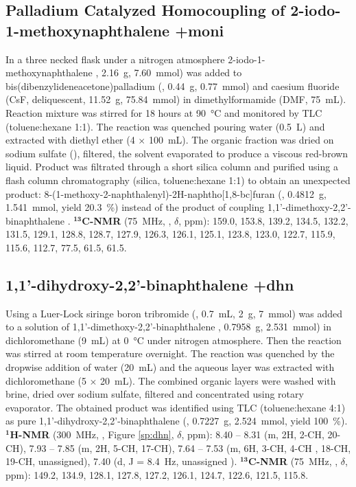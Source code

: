 \subsection{Palladium Catalyzed Homocoupling of 2-iodo-1-methoxy\-naphthalene \cmpd+{moni}}\label{sec:sperimentale-schifo}
In a three necked flask under a nitrogen atmosphere 2-iodo-1-methoxy\-naphthalene , 2.16~g, 7.60~mmol) was added to bis(di\-benzyl\-idene\-acetone)\-palladium (, 0.44~g, 0.77~mmol) and caesium fluoride (CsF, deliquescent, 11.52~g, 75.84~mmol) in dimethylformamide (DMF, 75~mL). Reaction mixture was stirred for 18 hours at \SI{90}{\celsius} and monitored by TLC (toluene\-:hexane 1:1). The reaction was quenched pouring water (0.5~L) and extracted with diethyl ether (4 $\times$ 100~mL). The organic fraction was dried on sodium sulfate (), filtered, 
the solvent evaporated to produce a viscous red-brown liquid. Product was filtrated through a short silica column and purified using a flash column chromatography (silica, toluene\-:hexane 1:1) to obtain an unexpected product: 8-(1-methoxy-2-naphthalenyl)-2H-naphtho[1,8-bc]furan (, 0.4812~g, 1.541~mmol, yield 20.3~\%) instead of the product of coupling 1,1'-dimethoxy-2,2'-bi\-naphthalene . $\mathbf{^{13}}$\textbf{C-NMR} (75~MHz, , $\delta$, ppm):  159.0, 153.8, 139.2, 134.5, 132.2, 131.5, 129.1, 128.8, 128.7, 127.9, 126.3, 126.1, 125.1, 123.8, 123.0, 122.7, 115.9, 115.6, 112.7, 77.5, 61.5, 61.5.

\subsection{1,1'-di\-hydroxy-2,2'-bi\-naphthalene \cmpd+{dhn}}\label{sub:sperimentale-dhn}

Using a Luer-Lock siringe boron tribromide (, 0.7~mL, 2~g, 7~mmol) was added to a solution of 1,1'-di\-meth\-oxy-2,2'-bi\-naphthalene , 0.7958~g, 2.531~mmol) in di\-chloro\-methane (9~mL) at \SI{0}{\celsius} under nitrogen atmosphere. Then the reaction was stirred at room temperature overnight. The reaction was quenched by the dropwise addition of water (20~mL) and the aqueous layer was extracted with di\-chloro\-methane (5 $\times$ 20~mL). The combined organic layers were washed with brine, dried over sodium sulfate, filtered and concentrated using rotary evaporator. 
The obtained product was identified using TLC (toluene\-:hexane 4:1) as pure 1,1'-di\-hydroxy-2,2'-bi\-naphthalene (, 0.7227~g, 2.524~mmol, yield 100~\%). $\mathbf{^{1}}$\textbf{H-NMR} (300~MHz, , Figure \ref{sp:dhn}, $\delta$, ppm):  8.40 – 8.31 (m, 2H, 2-CH, 20-CH), 7.93 – 7.85 (m, 2H, 5-CH, 17-CH), 7.64 – 7.53 (m, 6H, 3-CH, 4-CH%
, 18-CH, 19-CH, unassigned), 7.40 (d, J = 8.4~Hz, unassigned%
). $\mathbf{^{13}}$\textbf{C-NMR} (75~MHz, , $\delta$, ppm):  149.2, 134.9, 128.1, 127.8, 127.2, 126.1, 124.7, 122.6, 121.5, 115.8.

